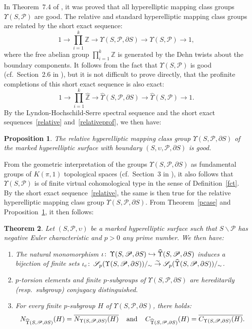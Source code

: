 \documentclass[12pt,twoside]{amsart}
\newcommand\Z{{\mathbb Z}}
\newcommand\ZZ{\widehat{\mathbb Z}}
\newcommand\cP{{\mathscr P}}
\newcommand\hookra{\hookrightarrow}
\newcommand\sr{\stackrel}
\newcommand\ssm{\smallsetminus}
\newcommand\ol{\overline}
\newcommand\cS{{\mathscr S}}
\newcommand\U{\Upsilon}
\newcommand\wh{\widehat}
\def\co{\colon\thinspace}
\def\u{{\upsilon}}
\def\dS{{\partial S}}
\newtheorem{theorem}{Theorem}[section]
\newtheorem{proposition}[theorem]{Proposition}
\theoremstyle{definition}
\begin{document}
In Theorem~7.4 of \cite{Hyp}, it was proved that all hyperelliptic mapping class groups $\U(S,\cP)$ are good. The relative and standard hyperelliptic
mapping class groups are related by the short exact sequence:
\begin{equation}\label{relative}
1\to\prod_{i=1}^k\Z\to\U(S,\cP,\dS)\to\U(S,\cP)\to 1,
\end{equation}
where the free abelian group $\prod_{i=1}^k\Z$ is generated by the Dehn twists about the boundary components.
It follows from the fact that $\U(S,\cP)$ is good (cf.\ Section~2.6 in \cite{Serre}), but it is not difficult to prove directly, that the profinite completions of
this short exact sequence is also exact:
\begin{equation}\label{relativeprof}
1\to\prod_{i=1}^k\ZZ\to\wh{\U}(S,\cP,\dS)\to\wh{\U}(S,\cP)\to 1.
\end{equation}
By the Lyndon-Hochschild-Serre spectral sequence and the short exact sequences~\eqref{relative} and~\eqref{relativeprof}, we then have:

\begin{proposition}\label{Hypgood}The relative hyperelliptic mapping class group $\U(S,\cP,\dS)$ of the marked hyperelliptic surface 
with boundary $(S,\u,\cP,\dS)$ is good.
\end{proposition}

From the geometric interpretation of the groups $\U(S,\cP,\dS)$ as fundamental groups of $K(\pi,1)$ topological spaces 
(cf.\ Section~3 in \cite{Hyp}), it also follows that $\U(S,\cP)$ is of finite virtual cohomological type in the sense of Definition~\ref{fct}. 
By the short exact sequence~\eqref{relative}, the same is then true for the relative hyperelliptic mapping class group $\U(S,\cP,\dS)$.
From Theorem~\ref{pcase} and Proposition~\ref{Hypgood}, it then follows:

\begin{theorem}\label{Hyptorsion}Let $(S,\cP,\u)$ be a marked hyperelliptic surface such that $S\ssm\cP$ has negative Euler characteristic
and $p>0$ any prime number. We then have:
\begin{enumerate}
\item The natural monomorphism $\iota\co\U(S,\cP,\dS)\hookra\wh{\U}(S,\cP,\dS)$ induces a bijection of finite sets
$\iota_c\co\cS_p(\U(S,\cP,\dS))/_{\sim}\sr{\sim}{\to}\cS_p(\wh{\U}(S,\cP,\dS))/_{\sim}$. 
\item $p$-torsion elements and finite $p$-subgroups of $\U(S,\cP,\dS)$ are hereditarily (resp.\ subgroup) conjugacy distinguished.
\item For every finite $p$-subgroup $H$ of $\U(S,\cP,\dS)$, there holds: 
\[N_{\wh{\U}(S,\cP,\dS)}(H)=\ol{N_{\U(S,\cP,\dS)}(H)}\hspace{0.4cm} \mbox{and}\hspace{0.4cm} C_{\wh{\U}(S,\cP,\dS)}(H)=\ol{C_{\U(S,\cP,\dS)}(H)}.\]
\end{enumerate}
\end{theorem}
\end{document}
